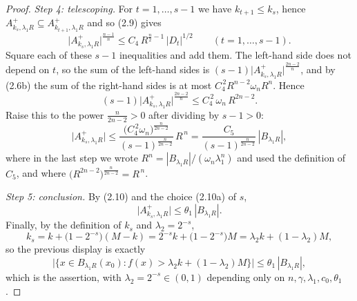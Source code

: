 \begin{proof}
\emph{Step 4: telescoping.}  For $t=1,\dots,s-1$ we have $k_{t+1}\le k_s$, hence
$A^+_{k_s,\lambda_1R}\subseteq A^+_{k_{t+1},\lambda_1R}$ and so (2.9) gives
\[
\bigl|A^+_{k_s,\lambda_1R}\bigr|^{\frac{n-1}n}\le C_4\,R^{\frac n2-1}\,|D_t|^{1/2}
\qquad(t=1,\dots,s-1).
\]
Square each of these $s-1$ inequalities and add them.  The left-hand side does
not depend on $t$, so the sum of the left-hand sides is
$(s-1)\bigl|A^+_{k_s,\lambda_1R}\bigr|^{\frac{2n-2}n}$, and by (2.6b) the sum of
the right-hand sides is at most $C_4^{\,2}R^{n-2}\omega_nR^n$.  Hence
\[
(s-1)\bigl|A^+_{k_s,\lambda_1R}\bigr|^{\frac{2n-2}n}
\le C_4^{\,2}\,\omega_n\,R^{2n-2} .
\]
Raise this to the power $\frac n{2n-2}>0$ after dividing by $s-1>0$:
\[
\bigl|A^+_{k_s,\lambda_1R}\bigr|
\le\frac{\bigl(C_4^{\,2}\omega_n\bigr)^{\frac n{2n-2}}}{(s-1)^{\frac n{2n-2}}}\,
R^{\,n}
=\frac{C_5}{(s-1)^{\frac n{2n-2}}}\,|B_{\lambda_1R}| ,
\tag{2.10}
\]
where in the last step we wrote $R^n=|B_{\lambda_1R}|/(\omega_n\lambda_1^n)$ and
used the definition of $C_5$, and where
$\bigl(R^{2n-2}\bigr)^{\frac n{2n-2}}=R^{\,n}$.

\emph{Step 5: conclusion.}  By (2.10) and the choice (2.10a) of $s$,
\[
\bigl|A^+_{k_s,\lambda_1R}\bigr|\le\theta_1\,|B_{\lambda_1R}| .
\]
Finally, by the definition of $k_s$ and $\lambda_2=2^{-s}$,
\[
k_s=k+\bigl(1-2^{-s}\bigr)(M-k)=2^{-s}k+\bigl(1-2^{-s}\bigr)M
=\lambda_2k+(1-\lambda_2)M ,
\]
so the previous display is exactly
\[
\bigl|\{x\in B_{\lambda_1R}(x_0):f(x)>\lambda_2k+(1-\lambda_2)M\}\bigr|
\le\theta_1\,|B_{\lambda_1R}| ,
\]
which is the assertion, with $\lambda_2=2^{-s}\in(0,1)$ depending only on
$n,\gamma,\lambda_1,c_0,\theta_1$.
\end{proof}
